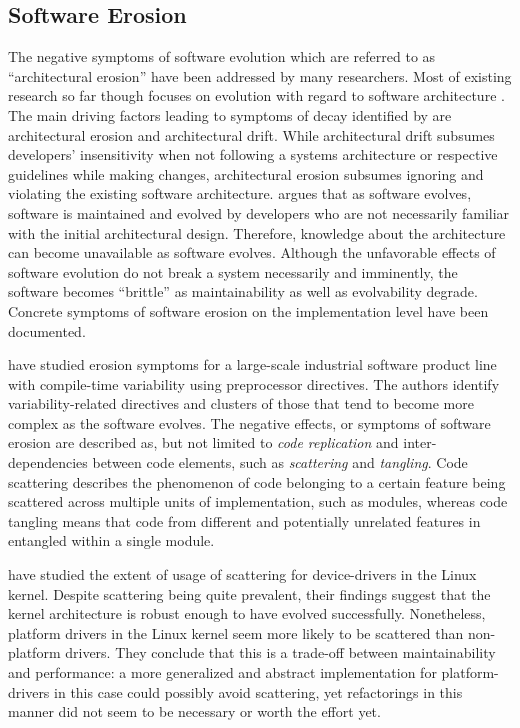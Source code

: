 \subsection{Software Erosion}
The negative symptoms of software evolution which are referred to as
``architectural erosion'' \citep{breivold_systematic_2012} have
been addressed by many researchers.
Most of existing research so far though focuses on evolution with regard to
software architecture \citep{breivold_systematic_2012}. The main driving factors leading to symptoms of decay
identified by \cite{perry_software_1991} are architectural erosion and
architectural drift. While architectural drift subsumes developers'
insensitivity when not following a systems architecture or respective guidelines while making changes, architectural erosion subsumes ignoring and violating the existing software
architecture. \cite{parnas_software_1994} argues that as software evolves, software is maintained
and evolved by developers who are not necessarily familiar with the initial
architectural design. Therefore, knowledge about the architecture can become
unavailable as software evolves. Although the unfavorable effects of software
evolution do not break a system necessarily and imminently, the software becomes ``brittle'' \citep{perry_software_1991}
as maintainability as well as evolvability degrade. Concrete  symptoms of software
erosion on the implementation level have been documented. 

\cite{zhang_variability_2013} have studied erosion symptoms for a large-scale
industrial software product line with compile-time variability using
preprocessor directives.
The authors identify variability-related directives and clusters of those that
tend to become more complex as the software evolves. The negative effects, or symptoms of software
erosion are described as, but not limited to \emph{code replication} and
inter-dependencies between code elements, such as \emph{scattering} and
\emph{tangling}. Code scattering describes the phenomenon of code belonging to
a certain feature being scattered across multiple units of implementation,
such as modules, whereas code tangling means that code from different and
potentially unrelated features in entangled within a single module.

\cite{passos_feature_2015} have studied the extent of usage of scattering for device-drivers
in the Linux kernel. Despite scattering being quite prevalent, their
findings suggest that the kernel architecture is robust enough to have evolved
successfully. Nonetheless, platform drivers in the Linux kernel seem more
likely to be scattered than non-platform drivers. They conclude that this is a
trade-off between maintainability and performance: a more generalized and
abstract implementation for platform-drivers in this case could possibly avoid
scattering, yet refactorings in this manner did not seem to be necessary or
worth the effort yet.

